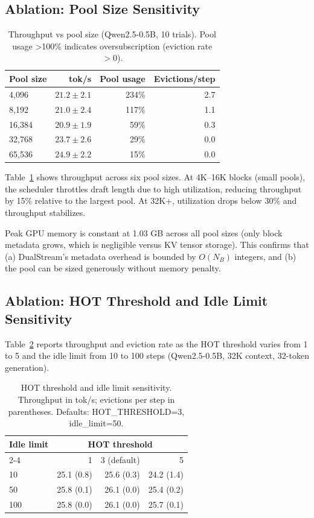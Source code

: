\documentclass[review]{elsarticle}
\theoremstyle{definition}
\theoremstyle{remark}
\begin{document}
\subsection{Ablation: Pool Size Sensitivity}

\begin{table}[t]
\centering
\caption{Throughput vs pool size (Qwen2.5-0.5B, 10 trials). Pool usage
>100\% indicates oversubscription (eviction rate $>0$).}
\label{tab:poolsize}
\begin{tabular}{lrrr}
\toprule
Pool size & tok/s & Pool usage & Evictions/step \\
\midrule
4,096  & $21.2 \pm 2.1$ & 234\% & 2.7 \\
8,192  & $21.0 \pm 2.4$ & 117\% & 1.1 \\
16,384 & $20.9 \pm 1.9$ & 59\% & 0.3 \\
32,768 & $23.7 \pm 2.6$ & 29\% & 0.0 \\
65,536 & $24.9 \pm 2.2$ & 15\% & 0.0 \\
\bottomrule
\end{tabular}
\end{table}

Table~\ref{tab:poolsize} shows throughput across six pool sizes. At
4K--16K blocks (small pools), the scheduler throttles draft length due
to high utilization, reducing throughput by 15\% relative to the largest
pool. At 32K+, utilization drops below 30\% and throughput stabilizes.

Peak GPU memory is constant at 1.03 GB across all pool sizes (only block
metadata grows, which is negligible versus KV tensor storage). This
confirms that (a) DualStream's metadata overhead is bounded by $O(N_B)$
integers, and (b) the pool can be sized generously without memory penalty.

\subsection{Ablation: HOT Threshold and Idle Limit Sensitivity}

Table~\ref{tab:hot_sweep} reports throughput and eviction rate as the
HOT threshold varies from 1 to 5 and the idle limit from 10 to 100 steps
(Qwen2.5-0.5B, 32K context, 32-token generation).

\begin{table}[t]
\centering
\caption{HOT threshold and idle limit sensitivity.
Throughput in tok/s; evictions per step in parentheses.
Defaults: HOT\_THRESHOLD=3, idle\_limit=50.}
\label{tab:hot_sweep}
\begin{tabular}{lrrr}
\toprule
\multirow{2}{*}{Idle limit} & \multicolumn{3}{c}{HOT threshold} \\
\cmidrule{2-4}
 & 1 & 3 (default) & 5 \\
\midrule
10  & 25.1 (0.8) & 25.6 (0.3) & 24.2 (1.4) \\
50  & 25.8 (0.1) & 26.1 (0.0) & 25.4 (0.2) \\
100 & 25.8 (0.0) & 26.1 (0.0) & 25.7 (0.1) \\
\bottomrule
\end{tabular}
\end{table}
\end{document}
